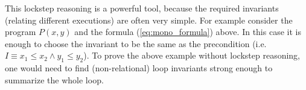 

This lockstep reasoning is a powerful tool, because the required invariants (relating
different executions) are often very simple. For example consider the
program $P(x,y)$ and the formula (\ref{eq:mono_formula}) above.
In this case it is enough to choose the invariant to be the same as the precondition (i.e. $I \equiv x_1 \leq x_2 \land y_1 \leq y_2$).
To prove the above example without lockstep reasoning, one would need to find (non-relational) loop invariants
strong enough to summarize the whole loop.

